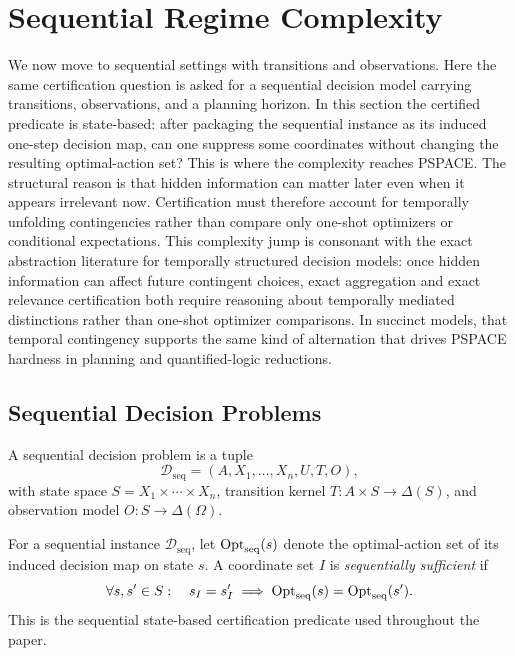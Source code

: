 \section{Sequential Regime Complexity}\label{sec:sequential}

We now move to sequential settings with transitions and observations. Here the same certification question is asked for a sequential decision model carrying transitions, observations, and a planning horizon. In this section the certified predicate is state-based: after packaging the sequential instance as its induced one-step decision map, can one suppress some coordinates without changing the resulting optimal-action set? This is where the complexity reaches PSPACE. The structural reason is that hidden information can matter later even when it appears irrelevant now. Certification must therefore account for temporally unfolding contingencies rather than compare only one-shot optimizers or conditional expectations. This complexity jump is consonant with the exact abstraction literature for temporally structured decision models: once hidden information can affect future contingent choices, exact aggregation and exact relevance certification both require reasoning about temporally mediated distinctions rather than one-shot optimizer comparisons. In succinct models, that temporal contingency supports the same kind of alternation that drives PSPACE hardness in planning and quantified-logic reductions.

\subsection{Sequential Decision Problems}

\begin{definition}\label{def:sequential-decision-problem}
A sequential decision problem is a tuple
\[
\mathcal{D}_{\mathrm{seq}}=(A,X_1,\ldots,X_n,U,T,O),
\]
with state space $S=X_1\times\cdots\times X_n$, transition kernel $T:A\times S\to\Delta(S)$, and observation model $O:S\to\Delta(\Omega)$.
\end{definition}

\begin{definition}\label{def:sequential-sufficient}
For a sequential instance $\mathcal D_{\mathrm{seq}}$, let $\mathrm{Opt}_{\mathrm{seq}}(s)$ denote the optimal-action set of its induced decision map on state $s$. A coordinate set $I$ is \emph{sequentially sufficient} if
\[
\forall s,s'\in S:\quad s_I=s'_I \implies \mathrm{Opt}_{\mathrm{seq}}(s)=\mathrm{Opt}_{\mathrm{seq}}(s').
\]
This is the sequential state-based certification predicate used throughout the paper.
\end{definition}

